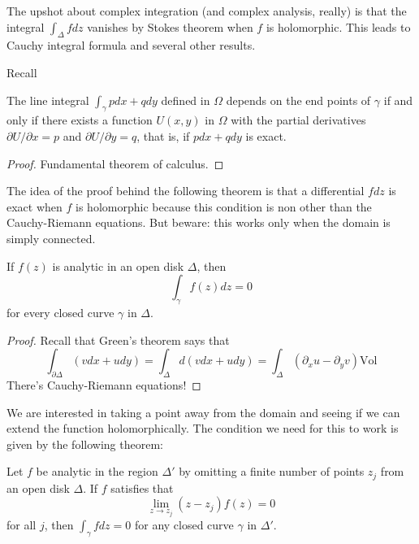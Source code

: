 \noindent
The upshot about complex integration
(and complex analysis, really)
is that the integral $\int_\Delta fdz$ vanishes
by Stokes theorem when $f$ is holomorphic.
This leads to Cauchy integral formula and
several other results.

Recall
\begin{theorem}[Stokes]
\label{theorem-Stokes}
\begin{reference}
\cite[Chapter 4, Theorem 1]{ahl}
\end{reference}
The line integral $\int_\gamma p dx +q dy$ defined in $\Omega$ depends on the
end points of $\gamma$ if and only if there exists a function $U(x,y)$ in
$\Omega$ with the partial derivatives $\partial U/\partial x=p$ and 
$\partial U/\partial y=q$, that is, if $pdx +qdy$ is exact.
\end{theorem}

\begin{proof}
Fundamental theorem of calculus.
\end{proof}

\noindent
The idea of the proof behind the following theorem is that 
a differential $fdz$ is exact when $f$ is holomorphic
because this condition is non other than the Cauchy-Riemann equations.
But beware: this works only when the domain is simply connected.

\begin{theorem}[Cauchy]
\label{theorem-Cauchy}
If $f(z)$ is analytic in an open disk $\Delta$, then
\begin{equation}
\label{equation-Cauchy-theorem}
\int_\gamma f(z)dz=0
\end{equation}
for every closed curve $\gamma$ in $\Delta$.
\end{theorem}

\begin{proof}
Recall that Green's theorem says that
$$
\int_{\partial\Delta}(vdx+udy)=\int_\Delta d(vdx+udy)
=\int_\Delta(\partial_xu-\partial_yv)\text{Vol}
$$
There's Cauchy-Riemann equations!
\end{proof}

\noindent
We are interested in taking a point away from the domain
and seeing if we can extend the function holomorphically.
The condition we need for this to work is given by the following theorem:

\begin{theorem}
\label{theorem-Cauchy-removable}
Let $f$ be analytic in the region $\Delta'$ by omitting a finite number of
points $z_j$ from an open disk $\Delta$. If $f$ satisfies that
\begin{equation}
\label{equation-removable-singularity}
\lim_{z\to z_j} (z-z_j)f(z)=0
\end{equation}
for all $j$, then $\int_\gamma fdz=0$ for any closed curve
$\gamma$ in $\Delta'$.
\end{theorem}

